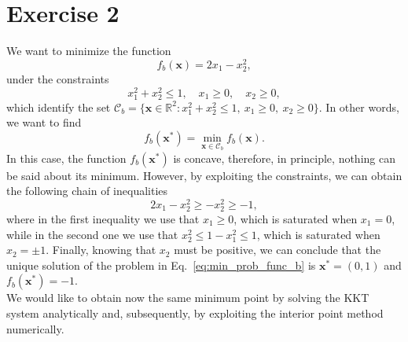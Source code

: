 \documentclass[a4paper,11pt]{article}
\begin{document}
\section*{Exercise 2}
We want to minimize the function
\begin{equation}
	f_{b}(\textbf{x})=2x_{1} - x_{2}^2,
	\label{eq:func_b}
\end{equation}
under the constraints
\begin{equation}
	x_{1}^2 + x_{2}^2 \le 1, \quad x_{1}\ge0, \quad x_{2}\ge0,
	\label{eq:constr_b}
\end{equation}
which identify the set $\mathcal{C}_{b} = \{\textbf{x}\in \mathbb{R}^2 : x_{1}^2 + x_{2}^2 \le 1, \ x_{1}\ge0,\ x_{2}\ge0 \}$. In other words, we want to find
\begin{equation}
	f_b(\textbf{x}^*) = \min_{\textbf{x} \in \mathcal{C}_b} f_b(\textbf{x}).
	\label{eq:min_prob_func_b}
\end{equation}
In this case, the function $f_b(\textbf{x}^*)$ is concave, therefore, in principle, nothing can be said about its minimum. However, by exploiting the constraints, we can obtain the following chain of inequalities
\begin{equation}
	2x_{1}-x_{2}^2\ge-x_{2}^2\ge-1,
\end{equation}
where in the first inequality we use that $x_{1}\ge0$, which is saturated when $x_{1}=0$, while in the second one we use that $x_{2}^2 \le 1-x_{1}^2\le1$, which is saturated when $x_{2}=\pm1$. Finally, knowing that $x_{2}$ must be positive, we can conclude that the unique solution of the problem in Eq.~\eqref{eq:min_prob_func_b} is $\textbf{x}^*=(0,1)$ and $f_b(\textbf{x}^*)=-1$.\\

\noindent We would like to obtain now the same minimum point by solving the KKT system analytically and, subsequently, by exploiting the interior point method numerically.
\end{document}
